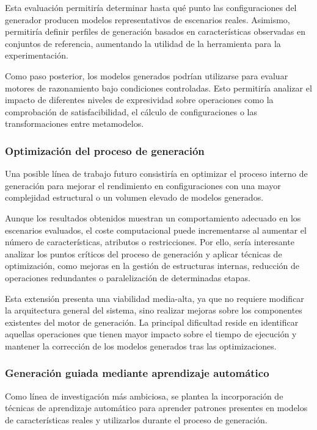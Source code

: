 Esta evaluación permitiría determinar hasta qué punto las configuraciones del
generador producen modelos representativos de escenarios reales. Asimismo,
permitiría definir perfiles de generación basados en características observadas
en conjuntos de referencia, aumentando la utilidad de la herramienta para la
experimentación.

Como paso posterior, los modelos generados podrían utilizarse para evaluar
motores de razonamiento bajo condiciones controladas. Esto permitiría analizar
el impacto de diferentes niveles de expresividad sobre operaciones como la
comprobación de satisfacibilidad, el cálculo de configuraciones o las
transformaciones entre metamodelos.

\subsubsection*{Optimización del proceso de generación}

Una posible línea de trabajo futuro consistiría en optimizar el proceso interno
de generación para mejorar el rendimiento en configuraciones con una mayor
complejidad estructural o un volumen elevado de modelos generados.

Aunque los resultados obtenidos muestran un comportamiento adecuado en los
escenarios evaluados, el coste computacional puede incrementarse al aumentar el
número de características, atributos o restricciones. Por ello, sería
interesante analizar los puntos críticos del proceso de generación y aplicar
técnicas de optimización, como mejoras en la gestión de estructuras internas,
reducción de operaciones redundantes o paralelización de determinadas etapas.

Esta extensión presenta una viabilidad media-alta, ya que no requiere modificar
la arquitectura general del sistema, sino realizar mejoras sobre los componentes
existentes del motor de generación. La principal dificultad reside en identificar
aquellas operaciones que tienen mayor impacto sobre el tiempo de ejecución y
mantener la corrección de los modelos generados tras las optimizaciones.

\subsubsection*{Generación guiada mediante aprendizaje automático}

Como línea de investigación más ambiciosa, se plantea la incorporación de
técnicas de aprendizaje automático para aprender patrones presentes en modelos
de características reales y utilizarlos durante el proceso de generación.

